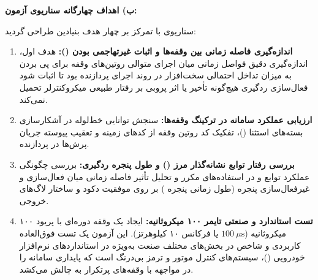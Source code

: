 \vspace{0.4cm}
\noindent
\textbf{ب) اهداف چهارگانه سناریوی آزمون:}\par
سناریوی  با تمرکز بر چهار هدف بنیادین طراحی گردید:
\begin{enumerate}
    \item \textbf{اندازه‌گیری فاصله زمانی بین وقفه‌ها و اثبات غیرتهاجمی بودن ():} هدف اول، اندازه‌گیری دقیق فواصل زمانی میان اجرای متوالی روتین‌های وقفه برای پی بردن به میزان تداخل احتمالی سخت‌افزار  در روند اجرای پردازنده بود تا اثبات شود فعال‌سازی ردگیری هیچ‌گونه تأخیر یا اثر پروبی بر رفتار طبیعی میکروکنترلر تحمیل نمی‌کند.
    \item \textbf{ارزیابی عملکرد سامانه در ترکینگ وقفه‌ها:} سنجش توانایی خط‌لوله در آشکارسازی بسته‌های استثنا ()، تفکیک کد روتین وقفه از کدهای زمینه و تعقیب پیوسته جریان پرش‌ها در پردازنده.
    \item \textbf{بررسی رفتار توابع نشانه‌گذار مرز () و طول پنجره ردگیری:} بررسی چگونگی عملکرد توابع  و  در استفاده‌های مکرر و تحلیل تأثیر فاصله زمانی میان فعال‌سازی و غیرفعال‌سازی پنجره (طول زمانی پنجره ) بر روی موفقیت دکود و ساختار لاگ‌های خروجی.
    \item \textbf{تست استاندارد و صنعتی تایمر ۱۰۰ میکروثانیه:} ایجاد یک وقفه دوره‌ای با پریود ۱۰۰ میکروثانیه ($100\ \mu\mathrm{s}$ یا فرکانس ۱۰ کیلوهرتز). این آزمون یک تست فوق‌العاده کاربردی و شاخص در بخش‌های مختلف صنعت به‌ویژه در استانداردهای نرم‌افزار خودرویی ()، سیستم‌های کنترل موتور و ترمز بی‌درنگ است که پایداری سامانه را در مواجهه با وقفه‌های پرتکرار به چالش می‌کشد.
\end{enumerate}

